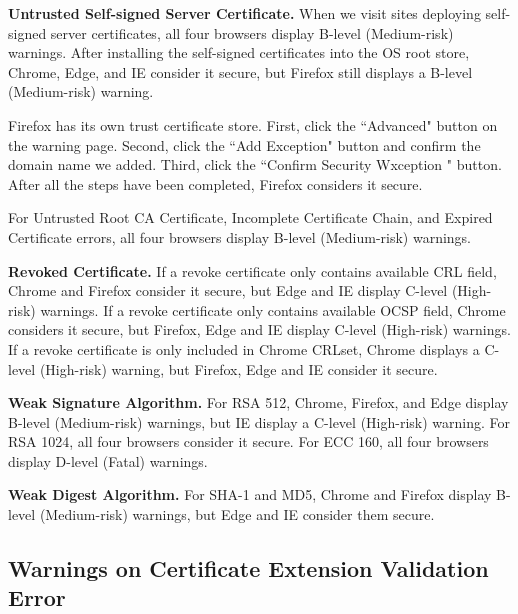 \textbf{Untrusted Self-signed Server Certificate.}
    When we visit sites deploying self-signed server certificates, all four browsers display B-level (Medium-risk) warnings.
    After installing the self-signed certificates into the OS root store, Chrome, Edge, and IE consider it secure, but Firefox still displays a B-level (Medium-risk) warning.

   Firefox has its own trust certificate store. 
   First, click the ``Advanced" button on the warning page.
   Second, click the ``Add Exception" button and confirm the domain name we added.
   Third, click the ``Confirm Security Wxception " button.
   After all the steps have been completed, Firefox considers it secure.


    For Untrusted Root CA Certificate, Incomplete Certificate Chain, and Expired Certificate errors,
        all four browsers display B-level (Medium-risk) warnings.

\textbf{Revoked Certificate.}
    If a revoke certificate only contains available CRL field,
        Chrome and Firefox consider it secure,
            but Edge and IE display C-level (High-risk) warnings.
    If a revoke certificate only contains available OCSP field,
        Chrome considers it secure, but Firefox,
            Edge and IE display C-level (High-risk) warnings.
    If a revoke certificate is only included in Chrome CRLset,
        Chrome displays a C-level (High-risk) warning,
            but Firefox, Edge and IE consider it secure.

\textbf{Weak Signature Algorithm.}
    For RSA 512,
        Chrome, Firefox, and Edge display B-level (Medium-risk) warnings,
            but IE display a C-level (High-risk) warning.
    For RSA 1024,
        all four browsers consider it secure.
    For ECC 160,
        all four browsers display D-level (Fatal) warnings.

\textbf{Weak Digest Algorithm.}
    For SHA-1 and MD5,
        Chrome and Firefox display B-level (Medium-risk) warnings,
            but Edge and IE consider them secure.

\subsection{Warnings on Certificate Extension Validation Error}

